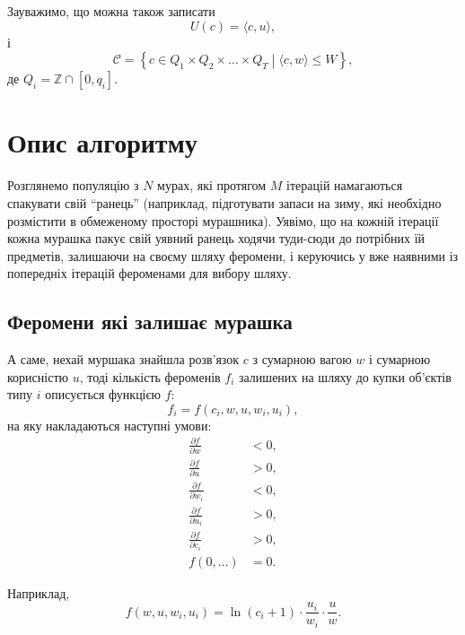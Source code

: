\documentclass[a4paper, 12pt]{article}
\numberwithin{equation}{subsection}
\newcommand{\ZZ}{\mathbb{Z}}
\numberwithin{equation}{section}
\begin{document}
Зауважимо, що можна також записати
\begin{equation}
 	U(c) = \langle c, u \rangle,
\end{equation}
і
\begin{equation}
	\mathcal{C} = \left\{ c \in Q_1 \times Q_2 \times \ldots \times Q_T \middle| \langle c, w \rangle \le W \right\},
\end{equation}
де $Q_i = \ZZ \cap [0, q_i]$.

\section{Опис алгоритму}

Розглянемо популяцію з $N$ мурах, які протягом $M$ ітерацій намагаються спакувати свій ``ранець'' (наприклад, підготувати запаси на зиму, які необхідно розмістити в обмеженому просторі мурашника). Уявімо, що на кожній ітерації кожна мурашка пакує свій уявний ранець ходячи туди-сюди до потрібних їй предметів, залишаючи на своєму шляху феромени, і керуючись у вже наявними із попередніх ітерацій фероменами для вибору шляху.

\subsection{Феромени які залишає мурашка}

А саме, нехай муршака знайшла розв'язок $c$ з сумарною вагою $w$ і сумарною корисністю $u$, тоді кількість фероменів $f_i$ залишених на шляху до купки об'єктів типу $i$ описується функцією $f$:
\begin{equation}
	f_i = f(c_i, w, u, w_i, u_i),
\end{equation}
на яку накладаються наступні умови:
\begin{align}
	\frac{\partial f}{\partial w} &< 0, \\
	\frac{\partial f}{\partial u} &> 0, \\
	\frac{\partial f}{\partial w_i} &< 0, \\
	\frac{\partial f}{\partial u_i} &> 0, \\
	\frac{\partial f}{\partial c_i} &> 0, \\
	f(0, \ldots) &= 0.
\end{align}

Наприклад, 
\begin{equation}
	f(w, u, w_i, u_i) = \ln (c_i + 1) \cdot \frac{u_i}{w_i} \cdot \frac{u}{w}.
\end{equation}
\end{document}
